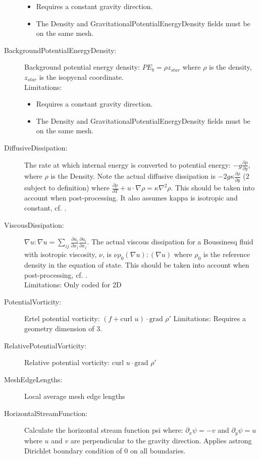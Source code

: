 \begin{description}
\begin{itemize}
	\item Requires a constant gravity direction. 
	\item The Density and GravitationalPotentialEnergyDensity fields must be on the same mesh. 
	\end{itemize} 
\item[BackgroundPotentialEnergyDensity:]Background potential energy density: $PE_b = \rho z_{star}$ where $\rho$ is the density, $z_{star}$ is the isopycnal coordinate. \\Limitations: 
	\begin{itemize}
	\item Requires a constant gravity direction. 
	\item The Density and GravitationalPotentialEnergyDensity fields must be on the same mesh. 
	\end{itemize}
\item[DiffusiveDissipation:] The rate at which internal energy is converted to potential energy: $-g\frac{\partial \rho}{\partial y}$, where $\rho$ is the Density. Note the actual diffusive dissipation is $-2g\kappa \frac{\partial \rho}{\partial y}$ (2 subject to definition) where $\frac{\partial \rho}{\partial T} + u\cdot \nabla \rho = \kappa \nabla^2 \rho$. This should be taken into account when post-processing. It also assumes kappa is isotropic and constant, cf. \cite{winters1995}.
\item[ViscousDissipation:] $\nabla u : \nabla u = \sum _{ij}\frac{\partial u_i}{\partial x_j}\frac{\partial u_i}{\partial x_j}$. The actual viscous dissipation for a Boussinesq fluid with isotropic viscosity, $\nu$, is $\nu \rho_0 (\nabla u):(\nabla u)$ where $\rho_0$ is the reference density in the equation of state. This should be taken into account when post-processing, cf. \cite{winters1995}. \\
Limitations: Only coded for 2D
\item[PotentialVorticity:]Ertel potential vorticity: $(f + \mbox{curl } u) \cdot \mbox{grad } \rho'$
	Limitations: Requires a geometry dimension of 3.  
\item[RelativePotentialVorticity:]Relative potential vorticity:  $\mbox{curl } u \cdot \mbox{grad } \rho'$  
\item[MeshEdgeLengths:]Local average mesh edge lengths  
\item[HorizontalStreamFunction:]Calculate the horizontal stream function psi where:  $\partial_x \psi = -v$ and  $\partial_y \psi = u$ where $u$ and $v$ are perpendicular to the gravity direction. Applies astrong Dirichlet boundary condition of $0$ on all boundaries.  

\end{description}
